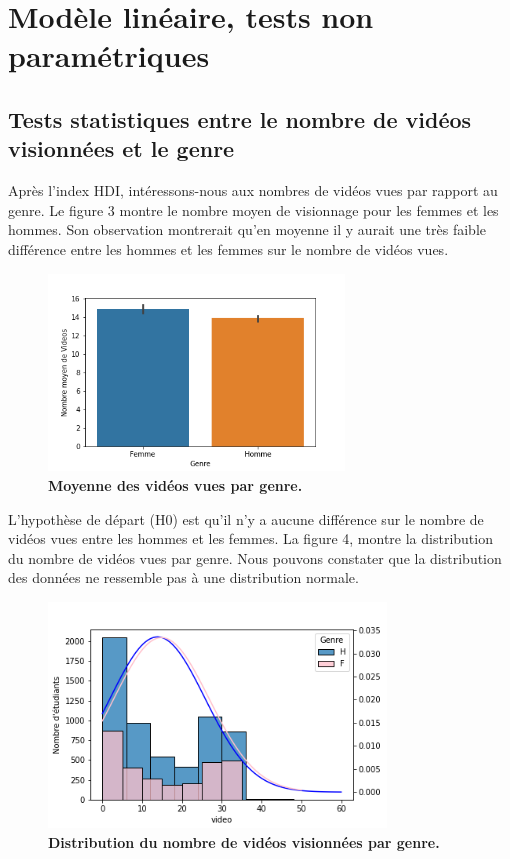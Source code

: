 \documentclass[12pt, a4paper, titlepage, table]{article}
\begin{document}
\section{Modèle linéaire, tests non paramétriques}
\subsection{Tests statistiques entre le nombre de vidéos visionnées et le genre}
Après l'index HDI, intéressons-nous aux nombres de vidéos vues par rapport au genre. Le figure 3 montre le nombre moyen de visionnage pour les femmes et les hommes. Son observation montrerait qu'en moyenne il y aurait une très faible différence entre les hommes et les femmes sur le nombre de vidéos vues. 

	\begin{figure}[H]
		\centering
		\includegraphics[width=0.7\textwidth]{../../graph/mean_video.png}
		\caption{\textbf{Moyenne des vidéos vues par genre.}}
	\end{figure}

L'hypothèse de départ (H0) est qu'il n'y a aucune différence sur le nombre de vidéos vues entre les hommes et les femmes. La figure 4, montre la distribution du nombre de vidéos vues par genre. Nous pouvons constater que la distribution des données ne ressemble pas à une distribution normale.

	\begin{figure}[H]
		\centering
		\includegraphics[width=0.8\textwidth]{../../graph/distribution_video.png}
		\caption{\textbf{Distribution du nombre de vidéos visionnées par genre.}}
	\end{figure}
\end{document}
